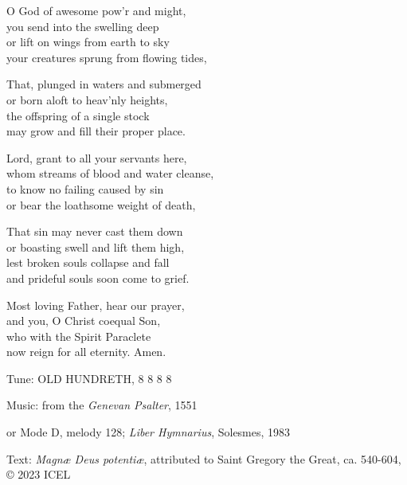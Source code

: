\hymn

\begin{hymnverse}
O God of awesome pow’r and might,\\
you send into the swelling deep\\
or lift on wings from earth to sky\\
your creatures sprung from flowing tides,

That, plunged in waters and submerged\\
or born aloft to heav’nly heights,\\
the offspring of a single stock\\
may grow and fill their proper place.

Lord, grant to all your servants here,\\
whom streams of blood and water cleanse,\\
to know no failing caused by sin\\
or bear the loathsome weight of death,

That sin may never cast them down\\
or boasting swell and lift them high,\\
lest broken souls collapse and fall\\
and prideful souls soon come to grief.

Most loving Father, hear our prayer,\\
and you, O Christ coequal Son,\\
who with the Spirit Paraclete\\
now reign for all eternity. Amen.
\end{hymnverse}

\begin{hymnsource}
Tune: OLD HUNDRETH, 8 8 8 8

Music: from the \emph{Genevan Psalter}, 1551

or Mode D, melody 128; \emph{Liber Hymnarius}, Solesmes, 1983

Text: \emph{Magnæ Deus potentiæ}, attributed to Saint Gregory the Great, ca. 540-604, © 2023 ICEL
\end{hymnsource}